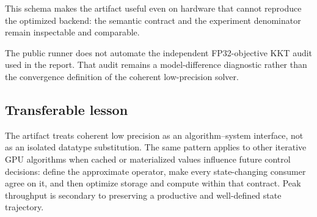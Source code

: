 This schema makes the artifact useful even on hardware that cannot reproduce
the optimized backend: the semantic contract and the experiment denominator
remain inspectable and comparable.

The public runner does not automate the independent FP32-objective KKT audit
used in the report. That audit remains a model-difference diagnostic rather
than the convergence definition of the coherent low-precision solver.

\subsection{Transferable lesson}

The artifact treats coherent low precision as an algorithm--system interface,
not as an isolated datatype substitution. The same pattern applies to other
iterative GPU algorithms when cached or materialized values influence future
control decisions: define the approximate operator, make every state-changing
consumer agree on it, and then optimize storage and compute within that
contract. Peak throughput is secondary to preserving a productive and
well-defined state trajectory.
